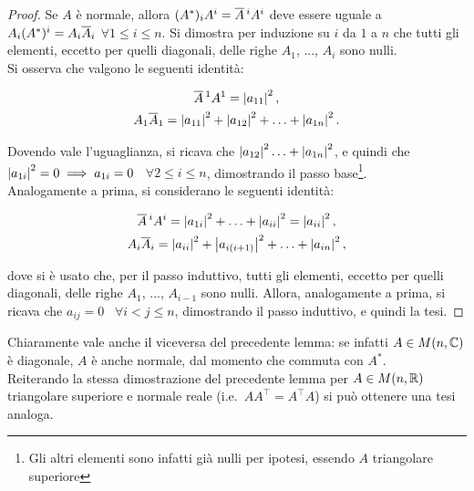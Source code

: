 \begin{proof}
	Se $A$ è normale, allora $(A^*)_i A^i = \overline{A}\,^i A^i$ deve essere uguale a
	$A_i (A^*)^i = A_i \overline{A}_i$ $\forall 1 \leq i \leq n$. Si dimostra per induzione
	su $i$ da $1$ a $n$ che tutti gli elementi, eccetto per quelli diagonali, delle
	righe $A_1$, ..., $A_i$ sono nulli. \\
	
	\basestep Si osserva che valgono le seguenti identità:
	
	\begin{gather*}
		\overline{A}\,^1 A^1 = \left\lvert a_{11} \right\rvert^2, \\
		A_1 \overline{A}_1 = \left\lvert a_{11} \right\rvert^2 + \left\lvert a_{12} \right\rvert^2 + \ldots + \left\lvert a_{1n} \right\rvert^2.
	\end{gather*}
	
	Dovendo vale l'uguaglianza, si ricava che $\left\lvert a_{12} \right\rvert^2 \ldots + \left\lvert a_{1n} \right\rvert^2$,
	e quindi che $\left\lvert a_{1i} \right\rvert^2 = 0 \implies a_{1i} = 0$ \, $\forall 2 \leq i \leq n$,
	dimostrando il passo base\footnote{Gli altri elementi sono infatti già nulli per ipotesi, essendo
		$A$ triangolare superiore}. \\
	
	\inductivestep Analogamente a prima, si considerano le seguenti identità:
	
	\begin{gather*}
		\overline{A}\,^i A^i = \left\lvert a_{1i} \right\rvert^2 + \ldots +  \left\lvert a_{ii} \right\rvert^2 = \left\lvert a_{ii} \right\rvert^2, \\
		A_i \overline{A}_i = \left\lvert a_{ii} \right\rvert^2 + \left\lvert a_{i(i+1)} \right\rvert^2 + \ldots + \left\lvert a_{in} \right\rvert^2,
	\end{gather*}
	
	dove si è usato che, per il passo induttivo, tutti gli elementi, eccetto per quelli diagonali, delle
	righe $A_1$, ..., $A_{i-1}$ sono nulli. Allora, analogamente a prima, si ricava che
	$a_{ij} = 0$ \, $\forall i < j \leq n$, dimostrando il passo induttivo, e quindi la tesi.
\end{proof}

\begin{remark}\nl
	\li Chiaramente vale anche il viceversa del precedente lemma: se infatti $A \in M(n, \mathbb C)$ è diagonale,
	$A$ è anche normale, dal momento che commuta con $A^*$. \\
	\li Reiterando la stessa dimostrazione del precedente lemma per $A \in M(n, \mathbb R)$ triangolare superiore e normale reale (i.e.~$AA^\top = A^\top A$) si può ottenere una tesi analoga.
\end{remark}

